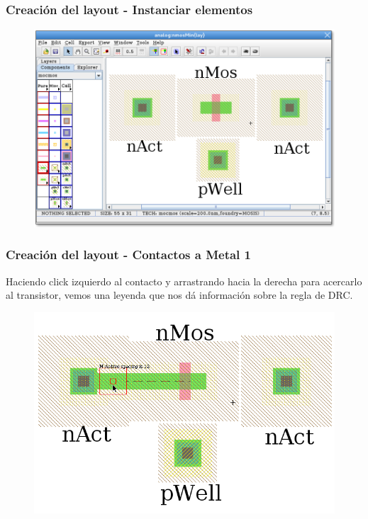 \documentclass{beamer}
\begin{document}
\begin{frame}
\frametitle{Creación del layout - Instanciar elementos}
\begin{figure}
  \includegraphics[width=1.00\linewidth]{figuras/edicionElectric-7.png}
\end{figure}
\end{frame}
\begin{frame}
\frametitle{Creación del layout - Contactos a Metal 1}
Haciendo click izquierdo al contacto y arrastrando hacia la derecha para acercarlo al transistor, vemos una leyenda que nos dá información sobre la regla de DRC.
\begin{figure}
  \includegraphics[width=0.89\linewidth]{figuras/edicionElectric-8.png}
\end{figure}

\end{frame}
\end{document}
